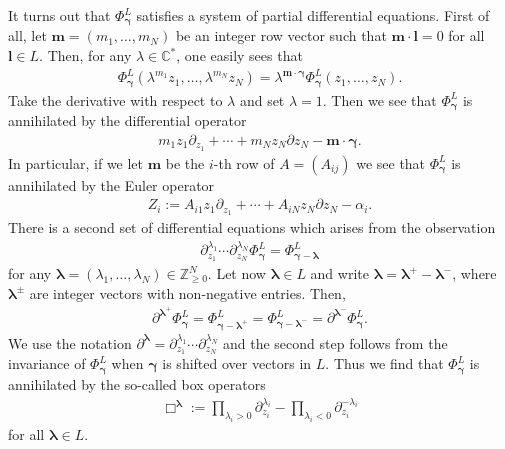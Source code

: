 \documentclass[pdftex]{sigma}
\numberwithin{equation}{section}
\begin{document}
It turns out that $\Phi_{\bm{\gamma}}^L$ satisfies a system of partial differential equations. First of all, let $\bm{m}=
(m_1,\dots,m_N)$ be an integer row vector such that $\bm{m}\cdot\bm{l}=0$ for all $\bm{l}\in L$.
Then, for any $\lambda \in \mathbb{C}^*$, one easily sees that
\begin{gather*}
\Phi_{\bm{\gamma}}^L(\lambda^{m_1}z_1,\dots,\lambda^{m_N}z_N)=
\lambda^{\bm{m}\cdot\bm{\gamma}}\Phi_{\bm{\gamma}}^L(z_1,\dots,z_N).
\end{gather*}
Take the derivative with respect to $\lambda$ and set $\lambda=1$. Then we see that
$\Phi_{\bm{\gamma}}^L$ is annihilated by the differential operator
\begin{gather*}
m_1z_1\partial_{z_1}+\cdots+m_Nz_N\partial{z_N}-\bm{m}\cdot\bm{\gamma}.
\end{gather*}
In particular, if we let $\bm{m}$ be the $i$-th row of $A=(A_{ij})$ we see
that $\Phi_{\bm{\gamma}}^L$ is annihilated by the Euler operator
\begin{gather*}
Z_i:=A_{i1}z_1\partial_{z_1}+\cdots+A_{iN}z_N\partial{z_N}-\alpha_i.
\end{gather*}
There is a second set of differential equations which arises from the
observation
\begin{gather*}
\partial_{z_1}^{\lambda_1}\cdots\partial_{z_N}^{\lambda_N}\Phi_{\bm{\gamma}}^L
=\Phi_{\bm{\gamma}-\bm{\lambda}}^L
\end{gather*}
for any $\bm{\lambda}=(\lambda_1,\dots,\lambda_N)\in\mathbb{Z}_{\ge0}^N$.
Let now $\bm{\lambda}\in L$ and write $\bm{\lambda}=\bm{\lambda}^+-\bm{\lambda}^-$,
where $\bm{\lambda}^\pm$ are integer vectors with non-negative entries. Then,
\begin{gather*}
\partial^{\bm{\lambda}^+}\Phi_{\bm{\gamma}}^L
=\Phi_{\bm{\gamma}-\bm{\lambda}^+}^L=\Phi_{\bm{\gamma}-\bm{\lambda}^-}^L
=\partial^{\bm{\lambda}^-}\Phi_{\bm{\gamma}}^L.
\end{gather*}
We use the notation $\partial^{\bm{\lambda}}=\partial_{z_1}^{\lambda_1}
\cdots\partial_{z_N}^{\lambda_N}$ and the second step follows from the invariance
of $\Phi_{\bm{\gamma}}^L$ when $\bm{\gamma}$ is shifted over vectors in $L$.
Thus we find that $\Phi_{\bm{\gamma}}^L$ is annihilated by the so-called box operators
\begin{gather*}
\Box^{\bm \lambda}:=\prod_{\lambda_i>0}\partial_{z_i}^{\lambda_i}-\prod_{\lambda_i<0}
\partial_{z_i}^{-\lambda_i}
\end{gather*}
for all $\bm{\lambda}\in L$.
\end{document}
